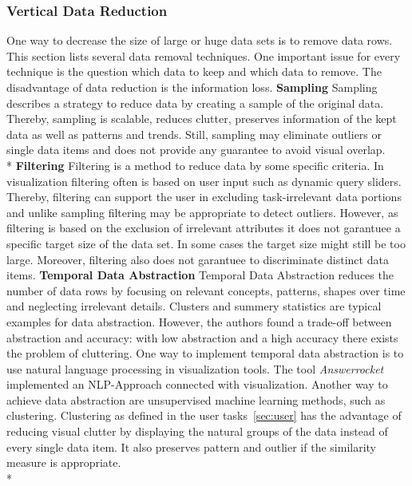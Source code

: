 \subsubsection{Vertical Data Reduction}
One way to decrease the size of large or huge data sets is to remove data rows. This section lists several data removal techniques.  One important issue for every technique is the question which data to keep and which data to remove. The disadvantage of data reduction is the information loss.
\textbf{Sampling}
Sampling describes a strategy to reduce data by creating a sample of the original data. Thereby, sampling is scalable, reduces clutter, preserves information of the kept data as well as patterns and trends\cite{PiringerHarald2011}. Still, sampling may eliminate outliers or single data items and does not provide any guarantee to avoid visual overlap. \\*
\textbf*{Filtering}
Filtering is a method to reduce data by some specific criteria. In visualization filtering often is based on user input such as dynamic query sliders. Thereby, filtering can support the user in excluding task-irrelevant data portions and unlike sampling filtering may be appropriate to detect outliers. However, as filtering is based on the exclusion of irrelevant attributes it does not garantuee a specific target size of the data set. In some cases the target size might still be too large. Moreover, filtering also does not garantuee to discriminate distinct data items\cite{PiringerHarald2011}.
\textbf*{Temporal Data Abstraction}
Temporal Data Abstraction\cite{Aigner2011} reduces the number of data rows by focusing on relevant concepts, patterns, shapes over time and neglecting irrelevant details. Clusters and summery statistics\cite{PiringerHarald2011} are typical examples for data abstraction. However, the authors found a trade-off between abstraction and accuracy: with low abstraction and a high accuracy there exists the problem of cluttering. 
One way to implement temporal data abstraction is to use natural language processing in visualization tools. The tool \textit{Answerrocket} implemented an NLP-Approach connected with visualization. Another way to achieve data abstraction are unsupervised machine learning methods, such as clustering.
Clustering as defined in the user tasks~\ref{sec:user} has the advantage of reducing visual clutter by displaying the natural groups of the data instead of every single data item. It also preserves pattern and outlier if the similarity measure is appropriate.\\*
